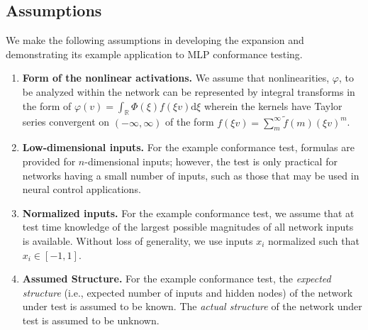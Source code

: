 \subsection{Assumptions}

We make the following assumptions in developing the expansion
and demonstrating its example application to MLP conformance testing.

\begin{enumerate}
	\item \textbf{Form of the nonlinear activations.}
	We assume that nonlinearities, $\varphi$, to be analyzed within the network
	can be represented by integral transforms in the form of
	$\varphi(v) = \int_{\mathbb{R}}\Phi(\xi)f(\xi v)\mathrm{d}\xi$
	wherein the kernels have Taylor series convergent on $(-\infty, \infty)$
	of the form $f(\xi v) = \sum_m^\infty \tilde{f}(m) (\xi v)^m$.
	
	\item \textbf{Low-dimensional inputs.}
	For the example conformance test, formulas are provided for
	$n$-dimensional inputs; however, the test is only practical
	for networks having a small number of inputs, such as those that
	may be used in neural control applications.
	
	\item \textbf{Normalized inputs.}
	For the example conformance test, we assume that at test time
	knowledge of the largest possible magnitudes of all network
	inputs is available.  Without loss of generality, we use inputs
	$x_i$ normalized such that $x_i \in \left[-1, 1\right]$.
	
	\item \textbf{Assumed Structure.}
	For the example conformance test, the \emph{expected structure}
	(i.e., expected number of inputs and hidden nodes) of the network
	under test is assumed to be known.  The \emph{actual structure}
	of the network under test is assumed to be unknown.
	
\end{enumerate}
